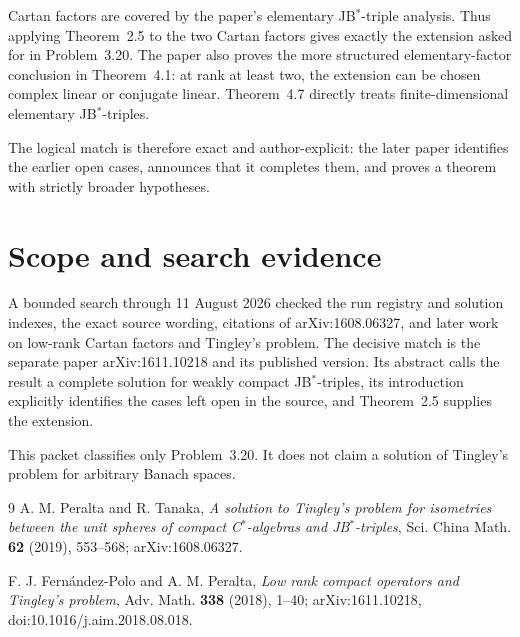 \documentclass[11pt]{article}
\begin{document}
Cartan factors are covered by the paper's elementary JB$^*$-triple
analysis.  Thus applying Theorem~2.5 to the two Cartan factors gives
exactly the extension asked for in Problem~3.20.  The paper also proves
the more structured elementary-factor conclusion in Theorem~4.1: at rank
at least two, the extension can be chosen complex linear or conjugate
linear.  Theorem~4.7 directly treats finite-dimensional elementary
JB$^*$-triples.

The logical match is therefore exact and author-explicit: the later paper
identifies the earlier open cases, announces that it completes them, and
proves a theorem with strictly broader hypotheses.

\section{Scope and search evidence}

A bounded search through 11 August 2026 checked the run registry and
solution indexes, the exact source wording, citations of arXiv:1608.06327,
and later work on low-rank Cartan factors and Tingley's problem.  The
decisive match is the separate paper arXiv:1611.10218 and its published
version.  Its abstract calls the result a complete solution for weakly
compact JB$^*$-triples, its introduction explicitly identifies the cases
left open in the source, and Theorem~2.5 supplies the extension.

This packet classifies only Problem~3.20.  It does not claim a solution of
Tingley's problem for arbitrary Banach spaces.

\begin{thebibliography}{9}
A. M. Peralta and R. Tanaka,
\emph{A solution to Tingley's problem for isometries between the unit
spheres of compact C$^*$-algebras and JB$^*$-triples},
Sci. China Math. \textbf{62} (2019), 553--568;
arXiv:1608.06327.

F. J. Fern\'andez-Polo and A. M. Peralta,
\emph{Low rank compact operators and Tingley's problem},
Adv. Math. \textbf{338} (2018), 1--40;
arXiv:1611.10218,
doi:10.1016/j.aim.2018.08.018.
\end{thebibliography}
\end{document}
